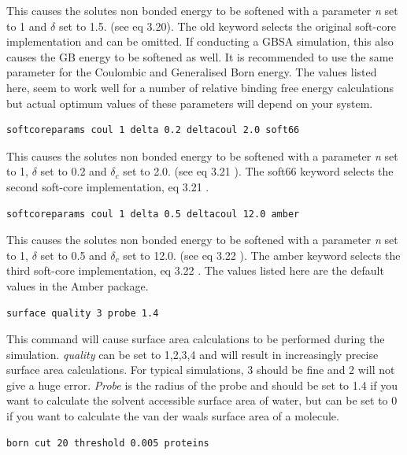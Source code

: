 \documentclass[letterpaper,10pt,english]{sphinxmanual}
\begin{document}
This causes the solutes non bonded energy to be softened with a parameter \emph{n} set to 1 and \(\delta\) set to 1.5. (see eq 3.20). The old keyword selects the original soft-core implementation and can be omitted. If conducting a GBSA simulation, this also causes the GB energy to be softened as well. It is recommended to use the same parameter for the Coulombic and Generalised Born energy. The values listed here, seem to work well for a number of relative binding free energy calculations but actual optimum values of these parameters will depend on your system.

\begin{Verbatim}[commandchars=\\\{\}]
softcoreparams coul 1 delta 0.2 deltacoul 2.0 soft66
\end{Verbatim}

This causes the solutes non bonded energy to be softened with a parameter \emph{n} set to 1, \(\delta\) set to 0.2 and \(\delta_c\) set to 2.0. (see eq 3.21 ). The soft66 keyword selects the second soft-core implementation, eq 3.21 .

\begin{Verbatim}[commandchars=\\\{\}]
softcoreparams coul 1 delta 0.5 deltacoul 12.0 amber
\end{Verbatim}

This causes the solutes non bonded energy to be softened with a parameter \emph{n} set to 1, \(\delta\) set to 0.5 and \(\delta_c\)  set to 12.0. (see eq 3.22 ). The amber keyword selects the third soft-core implementation, eq 3.22 . The values listed here are the default values in the Amber package.

\begin{Verbatim}[commandchars=\\\{\}]
surface quality 3 probe 1.4
\end{Verbatim}

This command will cause surface area calculations to be performed during the simulation. \emph{quality} can be set to 1,2,3,4 and will result in increasingly precise surface area calculations. For typical simulations, 3 should be fine and 2 will not give a huge error. \emph{Probe} is the radius of the probe and should be set to 1.4 if you want to calculate the solvent accessible surface area of water, but can be set to 0 if you want to calculate the van der waals surface area of a molecule.

\begin{Verbatim}[commandchars=\\\{\}]
born cut 20 threshold 0.005 proteins
\end{Verbatim}
\end{document}
